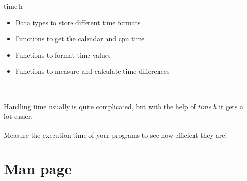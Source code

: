 \begin{frame}{time.h}
	\begin{itemize}
		\item Data types to store different time formats
		\item Functions to get the calendar and cpu time
		\item Functions to format time values
		\item Functions to measure and calculate time differences
	\end{itemize} \ \\ \ \\
	Handling time usually is quite complicated, but with the help of \textit{time.h} it gets a lot easier.\\
	\ \\
	Measure the execution time of your programs to see how efficient they are!
\end{frame}

\section{Man page}
